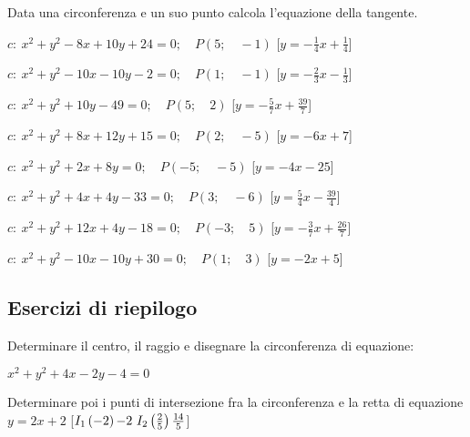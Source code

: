\begin{esercizio}\label{ese:}
 Data una circonferenza e un suo punto calcola l'equazione della tangente.
 \begin{enumeratea}
  \item  \(c:~x^2 + y^2 -8x +10y +24 = 0; \quad P \left (5; \quad -1 \right )\)
   \hfill [\(y = -\frac{1}{4} x +\frac{1}{4}\)]
  \item  \(c:~x^2 + y^2 -10x -10y -2 = 0; \quad P \left (1; \quad -1 \right )\)
   \hfill [\(y = -\frac{2}{3} x -\frac{1}{3}\)]
  \item  \(c:~x^2 + y^2 +10y -49 = 0; \quad P \left (5; \quad 2 \right )\)
   \hfill [\(y = -\frac{5}{7} x +\frac{39}{7}\)]
  \item  \(c:~x^2 + y^2 +8x +12y +15 = 0; \quad P \left (2; \quad -5 \right )\)
   \hfill [\(y = -6 x +7\)]
  \item  \(c:~x^2 + y^2 +2x +8y  = 0; \quad P \left (-5; \quad -5 \right )\)
   \hfill [\(y = -4 x -25\)]
  \item  \(c:~x^2 + y^2 +4x +4y -33 = 0; \quad P \left (3; \quad -6 \right )\)
   \hfill [\(y = \frac{5}{4} x -\frac{39}{4}\)]
  \item  \(c:~x^2 + y^2 +12x +4y -18 = 0; \quad P \left (-3; \quad 5 \right )\)
   \hfill [\(y = -\frac{3}{7} x +\frac{26}{7}\)]
  \item  \(c:~x^2 + y^2 -10x -10y +30 = 0; \quad P \left (1; \quad 3 \right )\)
   \hfill [\(y = -2 x +5\)]
 \end{enumeratea}
\end{esercizio}


\subsection{Esercizi di riepilogo}

\begin{esercizio}\label{ese:}
Determinare il centro, il raggio e disegnare la circonferenza di equazione:

\(x^2+y^2+4x-2y-4=0\)

Determinare poi i punti di intersezione fra la circonferenza e la retta di 
equazione 
\(y=2x+2\) 
\hfill [\(I_1\left( -2 \right){-2}~I_2\left( \frac{2}{5} \right){\frac{14}{5}}\)]
\end{esercizio}


